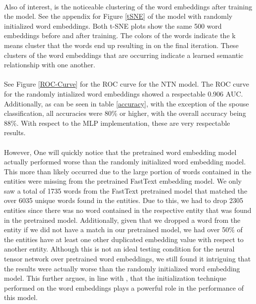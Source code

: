 \documentclass[11.5pt]{article}
\newcounter{Figure}
\begin{document}
\paragraph{} Also of interest, is the noticeable clustering of the word embeddings after training the model. See the appendix for Figure \ref{tSNE} of the model with randomly initialized word embeddings. Both t-SNE plots show the same 500 word embeddings before and after training. The colors of the words indicate the k means cluster that the words end up resulting in on the final iteration. These clusters of the word embeddings that are occurring indicate a learned semantic relationship with one another.

\paragraph{}  See Figure \ref{ROC-Curve} for the ROC curve for the NTN model. The ROC curve for the randomly intialized word embeddings showed a respectable 0.906 AUC. Additionally, as can be seen in table \ref{accuracy}, with the exception of the spouse classification, all accuracies were 80\% or higher, with the overall accuracy being 88\%. With respect to the MLP implementation, these are very respectable results. 

\paragraph{}  However, One will quickly notice that the pretrained word embedding model actually performed worse than the randomly initialized word embedding model. This more than likely occurred due to the large portion of words contained in the entities were missing from the pretrained FastText embedding model. We only saw a total of 1735 words from the FastText pretrained model that matched the over 6035 unique words found in the entities. Due to this, we had to drop 2305 entities since there was no word contained in the respective entity that was found in the pretrained model. Additionally, given that we dropped a word from the entity if we did not have a match in our pretrained model, we had over 50\% of the entities have at least one other duplicated embedding value with respect to another entity. Although this is not an ideal testing condition for the neural tensor network over pretrained word embeddings, we still found it intriguing that the results were actually worse than the randomly initialized word embedding model. This further argues, in line with \cite{socher2013reasoning}, that the initialization technique performed on the word embeddings plays a powerful role in the performance of this model.
\end{document}
